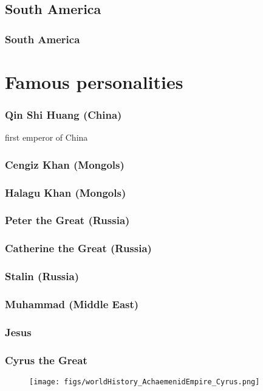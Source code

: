 \subsection{South America}
\begin{frame}\frametitle{South America}\logoEvolution

\end{frame}



\section{Famous personalities}
\begin{frame}\frametitle{Qin Shi Huang (China)}\logoEvolution
	first emperor of China
\end{frame}


\begin{frame}\frametitle{Cengiz Khan (Mongols)}\logoEvolution
\end{frame}

\begin{frame}\frametitle{Halagu Khan (Mongols)}\logoEvolution
\end{frame}

\begin{frame}\frametitle{Peter the Great (Russia)}\logoEvolution
\end{frame}


\begin{frame}\frametitle{Catherine the Great (Russia)}\logoEvolution
\end{frame}

\begin{frame}\frametitle{Stalin (Russia)}\logoEvolution
\end{frame}


\begin{frame}\frametitle{Muhammad (Middle East)}\logoEvolution
\end{frame}


\begin{frame}\frametitle{Jesus}\logoEvolution
\end{frame}




\begin{frame}\frametitle{Cyrus the Great}\logoEvolution
	\begin{figure}
		\texttt{[image: figs/worldHistory\_AchaemenidEmpire\_Cyrus.png]}
	\end{figure}
\end{frame}


